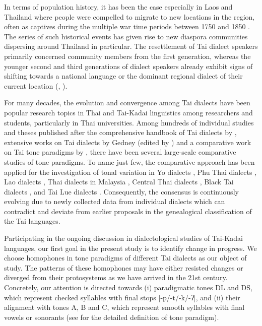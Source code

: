 \documentclass[output=paper]{langscibook}
\begin{document}
In terms of population history, it has been the case especially in Laos and Thailand where people were compelled to migrate to new locations in the region, often as captives during the multiple war time periods between 1750 and 1850 \citep{Piyabhan1998}. The series of such historical events has given rise to new diaspora communities dispersing around Thailand in particular. The resettlement of Tai dialect speakers primarily concerned community members from the first generation, whereas the younger second and third generations of dialect speakers already exhibit signs of shifting towards a national language or the dominant regional dialect of their current location (\citealt{Akkharawatthanakun2003}, \citealt{BunyasathitEtAl2016}).

For many decades, the evolution and convergence among Tai dialects have been popular research topics in Thai and Tai-Kadai linguistics among researchers and students, particularly in Thai universities. Among hundreds of individual studies and theses published after the comprehensive handbook of Tai dialects by \citet{Li1977}, extensive works on Tai dialects by Gedney (edited by \citealt{Hudak2008}) and a comparative work on Tai tone paradigms by \citet{Brown1985}, there have been several large-scale comparative studies of tone paradigms. To name just few, the comparative approach has been applied for the investigation of tonal variation in Yo dialects \citep{Koowatthanasiri1981}, Phu Thai dialects \citep{Srithonrat1983}, Lao dialects \citep{Akkharawatthanakun2003}, Thai dialects in Malaysia \citep{Damanhuri2004}, Central Thai dialects \citep{Canilao2010}, Black Tai dialects \citep{Burusphat2012}, and Tai Lue dialects \citep{Akkharawatthanakun2020}. Consequently, the consensus is continuously evolving due to newly collected data from individual dialects which can contradict and deviate from earlier proposals in the genealogical classification of the Tai languages.

Participating in the ongoing discussion in dialectological studies of Tai-Kadai languages, our first goal in the present study is to identify change in progress. We choose homophones in tone paradigms of different Tai dialects as our object of study. The patterns of these homophones may have either resisted changes or diverged from their protosystems as we have arrived in the 21st century. Concretely, our attention is directed towards (i) paradigmatic tones DL and DS, which represent checked syllables with final stops [-p/-t/-k/-ʔ], and (ii) their alignment with tones A, B and C, which represent smooth syllables with final vowels or sonorants (see  for the detailed definition of tone paradigm).
\end{document}
